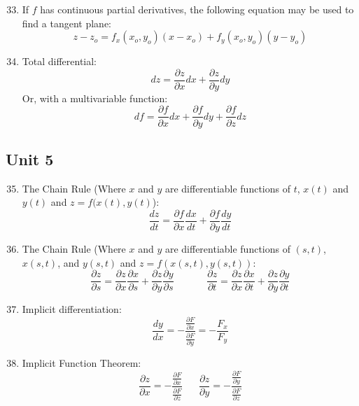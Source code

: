 \documentclass[12pt]{article}
\begin{document}
\begin{enumerate}
    \setcounter{enumi}{32}

  \item If $f$ has continuous partial derivatives, the following equation may be used to find a tangent plane:
    $$z-z_o=f_x(x_o,y_o)(x-x_o)+f_y(x_o,y_o)(y-y_o)$$

  \item Total differential:
    $$dz=\frac{\partial z}{\partial x}dx+\frac{\partial z}{\partial y}dy$$
    Or, with a multivariable function:
    $$df=\frac{\partial f}{\partial x}dx+\frac{\partial f}{\partial y}dy+\frac{\partial f}{\partial z}dz$$

\end{enumerate}

\subsection{Unit 5}

\begin{enumerate}
    \setcounter{enumi}{34}

  \item The Chain Rule (Where $x$ and $y$ are differentiable functions of $t$, $x(t)$ and $y(t)$ and $z=f(x(t),y(t)$):
    $$\frac{dz}{dt}=\frac{\partial f}{\partial x}\frac{dx}{dt}+\frac{\partial f}{\partial y}\frac{dy}{dt}$$

  \item The Chain Rule (Where $x$ and $y$ are differentiable functions of $(s,t)$, $x(s,t)$, and $y(s,t)$ and $z=f(x(s,t),y(s,t))$:
      $$\frac{\partial z}{\partial s}=\frac{\partial z}{\partial x}\frac{\partial x}{\partial s}+\frac{\partial z}{\partial y}\frac{\partial y}{\partial s}\,\,\,\,\,\,\,\,\,\,\,\,\,\,\,\,\,\,\,\,\frac{\partial z}{\partial t}=\frac{\partial z}{\partial x}\frac{\partial x}{\partial t}+\frac{\partial z}{\partial y}\frac{\partial y}{\partial t}$$

    \item Implicit differentiation:
      $$\frac{dy}{dx}=-\frac{\frac{\partial F}{\partial x}}{\frac{\partial F}{\partial y}}=-\frac{F_x}{F_y}$$

    \item Implicit Function Theorem:
      $$\frac{\partial z}{\partial x}=-\frac{\frac{\partial F}{\partial x}}{\frac{\partial F}{\partial z}}\,\,\,\,\,\,\,\,\,\,\frac{\partial z}{\partial y}=-\frac{\frac{\partial F}{\partial y}}{\frac{\partial F}{\partial z}}$$

\end{enumerate}
\end{document}
